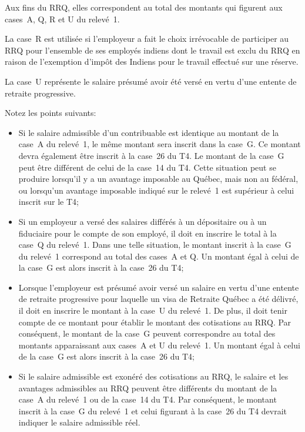 Aux fins du RRQ, elles correspondent au total des montants qui figurent aux cases~A, Q, R et U du relevé~1. 

La case~R est utilisée si l'employeur a fait le choix irrévocable de participer au RRQ pour l'ensemble de ses employés indiens dont le travail est exclu du RRQ en raison de l'exemption d'impôt des Indiens pour le travail effectué sur une réserve. 

La case~U représente le salaire présumé avoir été versé en vertu d'une entente de retraite progressive.

Notez les points suivants:
\begin{itemize}
	\item Si le salaire admissible d'un contribuable est identique au montant de la case~A du relevé~1, le même montant sera inscrit dans la case~G. Ce montant devra également être inscrit à la case~26 du T4. Le montant de la case~G peut être différent de celui de la case~14 du T4. Cette situation peut se produire lorsqu'il y a un avantage imposable au Québec, mais non au fédéral, ou lorsqu'un avantage imposable indiqué sur le relevé~1 est supérieur à celui inscrit sur le T4;
	\item Si un employeur a versé des salaires différés à un dépositaire ou à un fiduciaire pour le compte de son employé, il doit en inscrire le total à la case~Q du relevé~1. Dans une telle situation, le montant inscrit à la case~G du relevé~1 correspond au total des cases~A et Q. Un montant égal à celui de la case~G est alors inscrit à la case~26 du T4;
	\item Lorsque l'employeur est présumé avoir versé un salaire en vertu d'une entente de retraite progressive pour laquelle un visa de Retraite Québec a été délivré, il doit en inscrire le montant à la case~U du relevé~1. De plus, il doit tenir compte de ce montant pour établir le montant des cotisations au RRQ. Par conséquent, le montant de la case~G peuvent correspondre au total des montants apparaissant aux cases~A et U du relevé~1. Un montant égal à celui de la case~G est alors inscrit à la case~26 du T4; 
	\item Si le salaire admissible est exonéré des cotisations au RRQ, le salaire et les avantages admissibles au RRQ peuvent être différents du montant de la case~A du relevé~1 ou de la case~14 du T4. Par conséquent, le montant inscrit à la case~G du relevé~1 et celui figurant à la case~26 du T4 devrait indiquer le salaire admissible réel.
\end{itemize}

